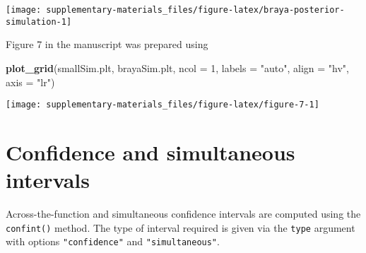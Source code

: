 \documentclass[12pt,]{article}
\newenvironment{Shaded}{\begin{snugshade}}{\end{snugshade}}
\newcommand{\KeywordTok}[1]{\textcolor[rgb]{0.13,0.29,0.53}{\textbf{{#1}}}}
\newcommand{\DataTypeTok}[1]{\textcolor[rgb]{0.13,0.29,0.53}{{#1}}}
\newcommand{\DecValTok}[1]{\textcolor[rgb]{0.00,0.00,0.81}{{#1}}}
\newcommand{\StringTok}[1]{\textcolor[rgb]{0.31,0.60,0.02}{{#1}}}
\newcommand{\NormalTok}[1]{{#1}}
\begin{document}
\begin{center}\texttt{[image: supplementary-materials\_files/figure-latex/braya-posterior-simulation-1]} \end{center}

Figure 7 in the manuscript was prepared using

\begin{Shaded}
\begin{Highlighting}[]
\KeywordTok{plot_grid}\NormalTok{(smallSim.plt, brayaSim.plt, }\DataTypeTok{ncol =} \DecValTok{1}\NormalTok{, }\DataTypeTok{labels =} \StringTok{"auto"}\NormalTok{,}
          \DataTypeTok{align =} \StringTok{"hv"}\NormalTok{, }\DataTypeTok{axis =} \StringTok{"lr"}\NormalTok{)}
\end{Highlighting}
\end{Shaded}

\begin{center}\texttt{[image: supplementary-materials\_files/figure-latex/figure-7-1]} \end{center}

\section{Confidence and simultaneous
intervals}\label{confidence-and-simultaneous-intervals}

Across-the-function and simultaneous confidence intervals are computed
using the \texttt{confint()} method. The type of interval required is
given via the \texttt{type} argument with options \texttt{"confidence"}
and \texttt{"simultaneous"}.
\end{document}
